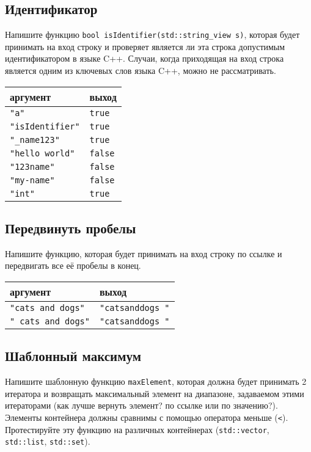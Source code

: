 \documentclass{article}
\begin{document}
\subsection{Идентификатор}
Напишите функцию \texttt{bool isIdentifier(std::string\_view s)}, которая будет принимать на вход строку и проверяет является ли эта строка допустимым идентификатором в языке C++. Случаи, когда приходящая на вход строка является одним из ключевых слов языка C++, можно не рассматривать. 
\begin{center}
\begin{tabular}{ l | l }
 аргумент & выход \\ \hline
 \texttt{"a"} & \texttt{true} \\
 \texttt{"isIdentifier"} & \texttt{true} \\
 \texttt{"\_name123"} & \texttt{true} \\
 \texttt{"hello world"} & \texttt{false} \\
 \texttt{"123name"} & \texttt{false} \\
 \texttt{"my-name"} & \texttt{false} \\
 \texttt{"int"} & \texttt{true}\\
\end{tabular}
\end{center}


\subsection{Передвинуть пробелы}
Напишите функцию, которая будет принимать на вход строку по ссылке и передвигать все её пробелы в конец.
\begin{center}
\begin{tabular}{ l | l }
 аргумент & выход \\ \hline
 \texttt{"cats and dogs"} & \texttt{"catsanddogs \quad "} \\
 \texttt{"   cats and  dogs"} & \texttt{"catsanddogs  \quad\quad\quad   "} \\
\end{tabular}
\end{center}



\subsection{Шаблонный максимум}
Напишите шаблонную функцию \texttt{maxElement}, которая должна будет принимать 2 итератора и возвращать максимальный элемент на диапазоне, задаваемом этими итераторами (как лучше вернуть элемент? по ссылке или по значению?). Элементы контейнера должны сравнимы с помощью оператора меньше (\texttt{<}). Протестируйте эту функцию на различных контейнерах (\texttt{std::vector}, \texttt{std::list}, \texttt{std::set}).
\end{document}
